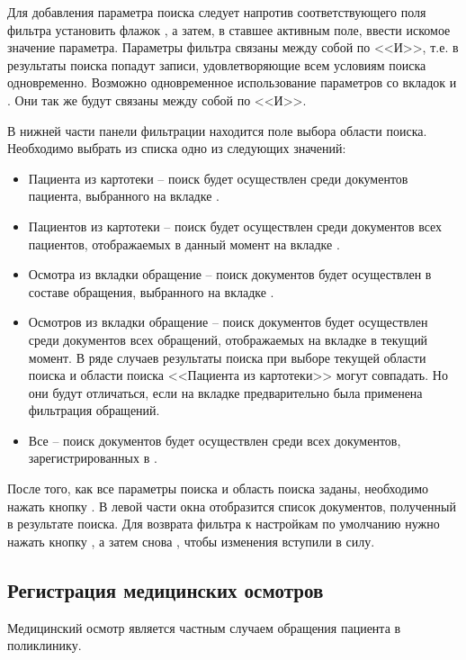 Для добавления параметра поиска следует напротив соответствующего поля фильтра установить флажок \putx , а затем, в ставшее активным поле, ввести искомое значение параметра. Параметры фильтра связаны между собой по <<И>>, т.е. в результаты поиска попадут записи, удовлетворяющие всем условиям поиска одновременно. Возможно одновременное использование параметров со вкладок  и . Они так же будут связаны между собой по <<И>>.

В нижней части панели фильтрации находится поле выбора области поиска. Необходимо выбрать из списка одно из следующих значений:
\begin{itemize}
 \item Пациента из картотеки – поиск будет осуществлен среди документов пациента, выбранного на вкладке .
 \item Пациентов из картотеки – поиск будет осуществлен среди документов всех пациентов, отображаемых в данный момент на вкладке .
 \item Осмотра из вкладки обращение – поиск документов будет осуществлен в составе обращения, выбранного на вкладке .
 \item Осмотров из вкладки обращение – поиск документов будет осуществлен среди документов всех обращений, отображаемых на вкладке  в текущий момент. В ряде случаев результаты поиска при выборе текущей области поиска и области поиска <<Пациента из картотеки>> могут совпадать. Но они будут отличаться, если на вкладке  предварительно была применена фильтрация обращений.
 \item Все – поиск документов будет осуществлен среди всех документов, зарегистрированных в \tmis.
\end{itemize}
 
После того, как все параметры поиска и область поиска заданы, необходимо нажать кнопку  . В левой части окна отобразится список документов, полученный в результате поиска. Для возврата фильтра к настройкам по умолчанию нужно нажать кнопку  , а затем снова  , чтобы изменения вступили в силу.

\subsection{Регистрация медицинских осмотров}

Медицинский осмотр является частным случаем обращения пациента в поликлинику.

